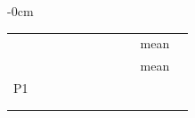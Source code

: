 \begin{table}[H]
\begin{adjustwidth}{-\extralength}{0cm}
\begin{tabular}{lrllrrlrrlr}
 & \numCfgTuningAnchorsItemTwo{} & \numTunedVTwoModelsDStateTwoHundredLearningRateSig{} & \numTunedVTwoModelsDStateTwoHundredWeightDecaySig{} & \numTunedVTwoModelsDStateTwoHundredHiddenWidth{} & \numTunedVTwoModelsDStateTwoHundredMegnetBlocks{} & \numTunedVTwoModelsDStateTwoHundredDropoutSig{} & \numTunedVTwoModelsDStateTwoHundredBatchSize{} & \numTunedVTwoModelsDStateTwoHundredReadoutMlpWidth{} & mean & \numTuningVTwoSummaryBestDStateTwoHundredBestValue{} \\
 & \numCfgTuningAnchorsItemThree{} & \numTunedVTwoModelsDStateSixHundredFiftyFourLearningRateSig{} & \numTunedVTwoModelsDStateSixHundredFiftyFourWeightDecaySig{} & \numTunedVTwoModelsDStateSixHundredFiftyFourHiddenWidth{} & \numTunedVTwoModelsDStateSixHundredFiftyFourMegnetBlocks{} & \numTunedVTwoModelsDStateSixHundredFiftyFourDropoutSig{} & \numTunedVTwoModelsDStateSixHundredFiftyFourBatchSize{} & \numTunedVTwoModelsDStateSixHundredFiftyFourReadoutMlpWidth{} & mean & \numTuningVTwoSummaryBestDStateSixHundredFiftyFourBestValue{} \\
\addlinespace
P1 & \numCfgTuningAnchorsItemOne{} & \numNetStgPOneTunedFiftyLearningRate{} & \numNetStgPOneTunedFiftyWeightDecay{} & \numNetStgPOneTunedFiftyHiddenWidth{} & \numNetStgPOneTunedFiftyMegnetBlocks{} & \numNetStgPOneTunedFiftyDropout{} & \numNetStgPOneTunedFiftyBatchSize{} & \numNetStgPOneTunedFiftyReadoutMlpWidth{} & \numNetStgPOneTunedFiftyPooling{} & \numNetStgPOneTunedFiftyBestValue{} \\
 & \numCfgTuningAnchorsItemTwo{} & \numNetStgPOneTunedTwoHundredLearningRate{} & \numNetStgPOneTunedTwoHundredWeightDecay{} & \numNetStgPOneTunedTwoHundredHiddenWidth{} & \numNetStgPOneTunedTwoHundredMegnetBlocks{} & \numNetStgPOneTunedTwoHundredDropout{} & \numNetStgPOneTunedTwoHundredBatchSize{} & \numNetStgPOneTunedTwoHundredReadoutMlpWidth{} & \numNetStgPOneTunedTwoHundredPooling{} & \numNetStgPOneTunedTwoHundredBestValue{} \\
 & \numCfgTuningAnchorsItemThree{} & \numNetStgPOneTunedSixHundredFiftyFourLearningRate{} & \numNetStgPOneTunedSixHundredFiftyFourWeightDecay{} & \numNetStgPOneTunedSixHundredFiftyFourHiddenWidth{} & \numNetStgPOneTunedSixHundredFiftyFourMegnetBlocks{} & \numNetStgPOneTunedSixHundredFiftyFourDropout{} & \numNetStgPOneTunedSixHundredFiftyFourBatchSize{} & \numNetStgPOneTunedSixHundredFiftyFourReadoutMlpWidth{} & \numNetStgPOneTunedSixHundredFiftyFourPooling{} & \numNetStgPOneTunedSixHundredFiftyFourBestValue{} \\
\bottomrule
\end{tabular}
\end{adjustwidth}
\end{table}

